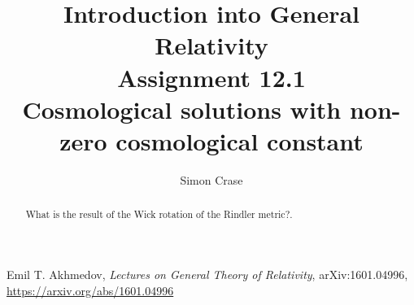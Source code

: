 \documentclass[]{article}
\title{Introduction into General Relativity\\Assignment 12.1\\Cosmological solutions with non-zero cosmological constant}
\author{Simon Crase}
\begin{document}
\maketitle

\begin{abstract}
What is the result of the Wick rotation of the Rindler metric?.
\end{abstract}

\section{}

\begin{thebibliography}{9}\label{section:biblio}
	\raggedright
	Emil T. Akhmedov,
	\emph{Lectures on General Theory of Relativity},
	arXiv:1601.04996,
	\url{https://arxiv.org/abs/1601.04996}
\end{thebibliography}
\end{document}
